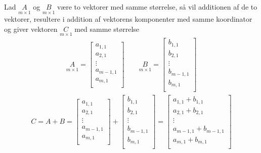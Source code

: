 \begin{defn}
Lad $\underset{m \times 1}{A}$ og $\underset{m \times 1}{B}$ være to vektorer med samme størrelse, så vil additionen af de to vektorer, resultere i addition af vektorens komponenter med samme koordinator og giver vektoren $\underset{m \times 1}{C}$ med samme størrelse
\begin{align*}
\underset{m \times 1}{A} = 
\begin{bmatrix}
a_{1,1}\\
a_{2,1}\\
\vdots \\
a_{m-1,1}\\
a_{m,1} \\
\end{bmatrix}
\qquad
\underset{m \times 1}{B} = 
\begin{bmatrix}
b_{1,1}\\
b_{2,1}\\
\vdots \\
b_{m-1,1}\\
b_{m,1} \\
\end{bmatrix}
\end{align*} 
\begin{align*}
C=A+B=
\begin{bmatrix}
a_{1,1}\\
a_{2,1}\\
\vdots \\
a_{m-1,1}\\
a_{m,1} \\
\end{bmatrix}
+
\begin{bmatrix}
b_{1,1}\\
b_{2,1}\\
\vdots \\
b_{m-1,1}\\
b_{m,1} \\
\end{bmatrix}
=
\begin{bmatrix}
a_{1,1}+b_{1,1}\\
a_{2,1}+b_{2,1}\\
\vdots \\
a_{m-1,1}+b_{m-1,1}\\
a_{m,1}+b_{m,1} \\
\end{bmatrix}
\end{align*}
\end{defn}
